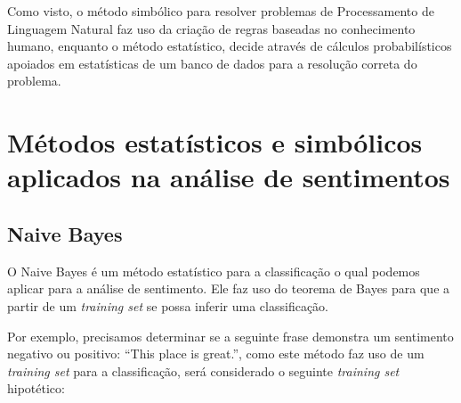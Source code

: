 Como visto, o método simbólico para resolver problemas de Processamento de
Linguagem Natural faz uso da criação de regras baseadas no conhecimento humano,
enquanto o método estatístico, decide através de cálculos probabilísticos
apoiados em estatísticas de um banco de dados para a resolução correta do
problema.


%
%
%

\chapter{Métodos estatísticos e simbólicos aplicados na análise de sentimentos}
\label{cap:Classificadores}


\section{Naive Bayes}

O Naive Bayes é um método estatístico para a classificação o qual podemos
aplicar para a análise de sentimento. Ele faz uso do teorema de Bayes para
que a partir de um \textit{training set} se possa inferir uma classificação.

Por exemplo, precisamos determinar se a seguinte frase demonstra um sentimento
negativo ou positivo: ``This place is great.'', como este método faz uso de um
\textit{training set} para a classificação, será considerado o seguinte \textit{training set} hipotético:


